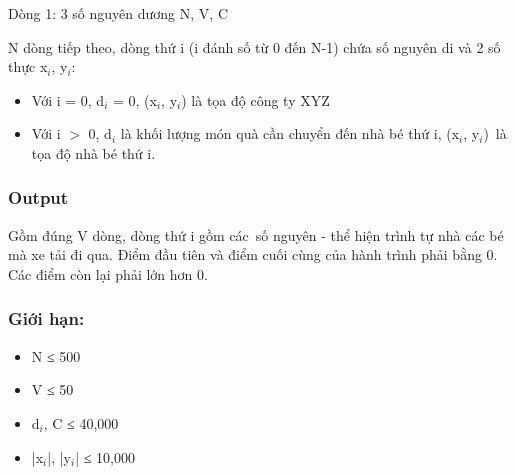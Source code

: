 Dòng 1: 3 số nguyên dương N, V, C

N dòng tiếp theo, dòng thứ i (i đánh số từ 0 đến N-1) chứa số nguyên di và 2 số thực x$_i$, y$_i$:
\begin{itemize}
	\item Với i = 0, d$_i$ = 0, (x$_i$, y$_i$) là tọa độ công ty XYZ
	\item Với i $>$ 0, d$_i$ là khối lượng món quà cần chuyển đến nhà bé thứ i, (x$_i$, y$_i$) là tọa độ nhà bé thứ i.
\end{itemize}

\subsubsection{Output}

Gồm đúng V dòng, dòng thứ i gồm các số nguyên - thể hiện trình tự nhà các bé mà xe tải đi qua. Điểm đầu tiên và điểm cuối cùng của hành trình phải bằng 0. Các điểm còn lại phải lớn hơn 0.

\subsubsection{Giới hạn:}
\begin{itemize}
	\item N ≤ 500
	\item V ≤ 50
	\item d$_i$, C ≤ 40,000
	\item |x$_i$|, |y$_i$| ≤ 10,000
\end{itemize}


